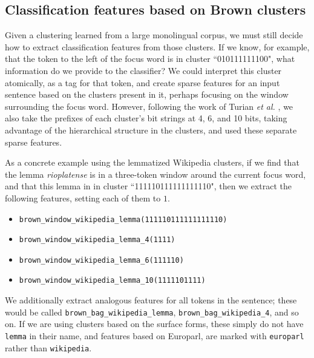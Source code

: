 \subsection{Classification features based on Brown clusters}
Given a clustering learned from a large monolingual corpus, we must still
decide how to extract classification features from those clusters. If we know,
for example, that the token to the left of the focus word is in cluster
``010111111100", what information do we provide to the classifier? We could
interpret this cluster atomically, as a tag for that token, and create sparse
features for an input sentence based on the clusters present in it, perhaps
focusing on the window surrounding the focus word. However, following the work
of Turian \emph{et al.} \cite{turian-ratinov-bengio:2010:ACL}, we also take the
prefixes of each cluster's bit strings at 4, 6, and 10 bits, taking advantage
of the hierarchical structure in the clusters, and used these separate sparse
features.

As a concrete example using the lemmatized Wikipedia clusters, if we find that
the lemma \emph{rioplatense} is in a three-token window around the current
focus word, and that this lemma in in cluster ``111110111111111110", then we
extract the following features, setting each of them to $1$.

\begin{itemize}
\item \texttt{brown\_window\_wikipedia\_lemma(111110111111111110)}
\item \texttt{brown\_window\_wikipedia\_lemma\_4(1111)}
\item \texttt{brown\_window\_wikipedia\_lemma\_6(111110)}
\item \texttt{brown\_window\_wikipedia\_lemma\_10(1111101111)}
\end{itemize}

We additionally extract analogous features for all tokens in the sentence;
these would be called \texttt{brown\_bag\_wikipedia\_lemma},
\texttt{brown\_bag\_wikipedia\_4}, and so on. If we are using clusters based on
the surface forms, these simply do not have \texttt{lemma} in their name, and
features based on Europarl, are marked with \texttt{europarl} rather than
\texttt{wikipedia}.

